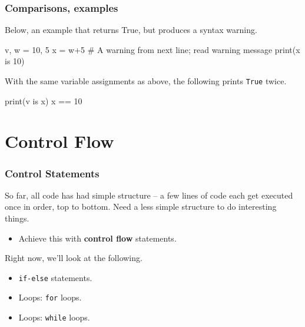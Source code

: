 \documentclass{beamer}
\newenvironment{codeblock}
    {\hfill\begin{beamerboxesrounded}[lower=codecol, width=0.8\textwidth]
    \medskip

    }
    { 
    \end{beamerboxesrounded}\hfill
    }
\theoremstyle{example}
\newcommand{\ttt}[1]{{\small\texttt{#1}}}
\begin{document}
\begin{frame}[fragile]
\frametitle{Comparisons, examples}
Below, an example that returns True, but produces a syntax warning.
\vspace*{12pt}

\begin{codeblock}

\begin{python}
v, w = 10, 5
x = w+5
# A warning from next line; read warning message
print(x is 10)
\end{python}

\end{codeblock}

\vfill
\pause
With the same variable assignments as above, the following prints \ttt{True} twice.
\vspace*{12pt}

\begin{codeblock}

\begin{python}
print(v is x)
x == 10
\end{python}

\end{codeblock}
	
\end{frame}

\section{Control Flow}

\begin{frame}
\frametitle{Control Statements}
So far, all code has had simple structure {--} a few lines of code each get executed once in order, top to bottom. Need a less simple structure to do interesting things. 
\begin{itemize}
    \item[] Achieve this with \textbf{control flow} statements.
\end{itemize}

\pause
Right now, we'll look at the following.
\begin{itemize}
	\item \ttt{if-else} statements.
    \pause
	\item Loops: \ttt{for} loops.
	\item Loops: \ttt{while} loops.
\end{itemize}
\end{frame}
\end{document}
